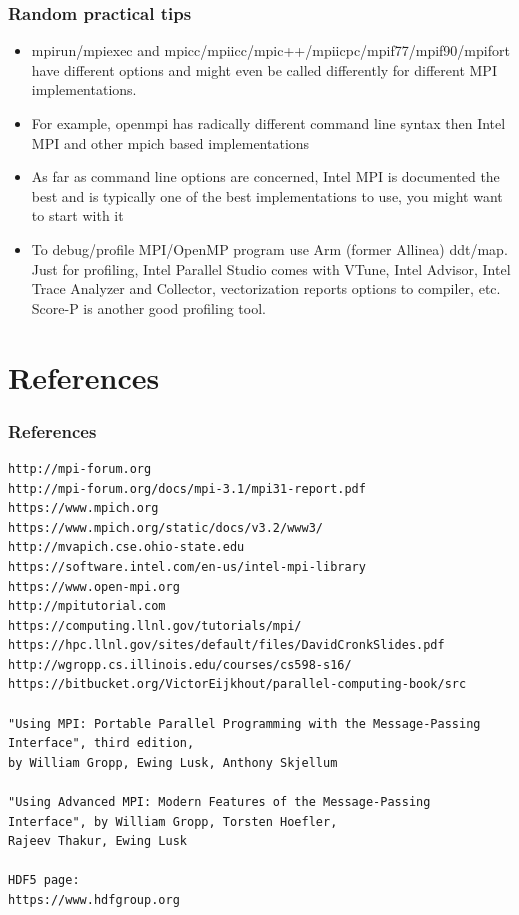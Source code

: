\documentclass{beamer}
\begin{document}
\begin{frame}[fragile]
  \frametitle{Random practical tips}
\begin{itemize}
\item {\color{mycolorcli}mpirun/mpiexec} and {\color{mycolorcli}mpicc/mpiicc/mpic++/mpiicpc/mpif77/mpif90/mpifort} have different options and might even be called differently for different MPI implementations. 
\item For example, openmpi has radically different command line syntax then Intel MPI and other mpich based implementations
\item As far as command line options are concerned, Intel MPI is documented the best and is typically one of the best implementations to use, you might want to start with it
\item To debug/profile MPI/OpenMP program use Arm (former Allinea) ddt/map. Just for profiling, Intel Parallel Studio comes with VTune, Intel Advisor, 
Intel Trace Analyzer and Collector, vectorization reports options to compiler, etc. 
Score-P is another good profiling tool.
\end{itemize}
\end{frame}


\section{References}
\begin{frame}[fragile]
  \frametitle{References}
{\tiny
\begin{verbatim}
http://mpi-forum.org
http://mpi-forum.org/docs/mpi-3.1/mpi31-report.pdf
https://www.mpich.org
https://www.mpich.org/static/docs/v3.2/www3/
http://mvapich.cse.ohio-state.edu
https://software.intel.com/en-us/intel-mpi-library
https://www.open-mpi.org
http://mpitutorial.com
https://computing.llnl.gov/tutorials/mpi/
https://hpc.llnl.gov/sites/default/files/DavidCronkSlides.pdf
http://wgropp.cs.illinois.edu/courses/cs598-s16/
https://bitbucket.org/VictorEijkhout/parallel-computing-book/src

"Using MPI: Portable Parallel Programming with the Message-Passing Interface", third edition,
by William Gropp, Ewing Lusk, Anthony Skjellum

"Using Advanced MPI: Modern Features of the Message-Passing Interface", by William Gropp, Torsten Hoefler, 
Rajeev Thakur, Ewing Lusk

HDF5 page:
https://www.hdfgroup.org
\end{verbatim}
}
\end{frame}


\end{document}
